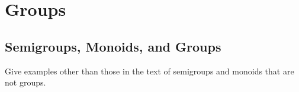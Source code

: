 \chapter{Groups}
\section{Semigroups, Monoids, and Groups}
    \begin{exercise}
        Give examples other than those in the text of semigroups and monoids that are not groups.
    \end{exercise}
    
